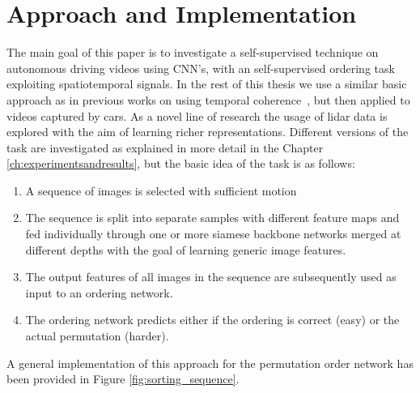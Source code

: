 %
\newpage
\chapter{Approach and Implementation}
\label{ch:approach_implementation}
The main goal of this paper is to investigate a self-supervised technique on autonomous driving videos using CNN's, with an self-supervised ordering task exploiting spatiotemporal signals. In the rest of this thesis we use a similar basic approach as in previous works on using temporal coherence~\cite{misra2016,lee2017}, but then applied to videos captured by cars. As a novel line of research the usage of lidar data is explored with the aim of learning richer representations. Different versions of the task are investigated as explained in more detail in the Chapter \ref{ch:experimentsandresults}, but the basic idea of the task is as follows:
\begin{enumerate}    
\item A sequence of images is selected with sufficient motion
\item The sequence is split into separate samples with different feature maps and fed individually through one or more siamese backbone networks merged at different depths with the goal of learning generic image features.
\item The output features of all images in the sequence are subsequently used as input to an ordering network.
\item The ordering network predicts either if the ordering is correct (easy)\cite{misra2016} or the actual permutation (harder)\cite{lee2017}.
\end{enumerate}
A general implementation of this approach for the permutation order network has been provided in Figure \ref{fig:sorting_sequence}.


